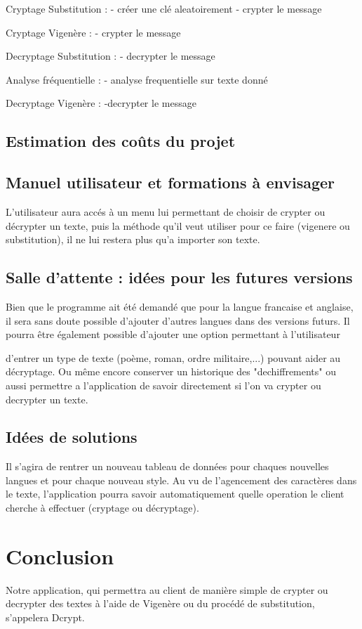 \documentclass[a4]{article}
\begin{document}
		Cryptage Substitution :
			- créer une clé aleatoirement
			- crypter le message
			
		Cryptage Vigenère :
			- crypter le message
			
		Decryptage Substitution :
			- decrypter le message
			
		Analyse fréquentielle :
			- analyse frequentielle sur texte donné
			
		Decryptage Vigenère :
			-decrypter le message
		
		\subsection{Estimation des coûts du projet}
		 
		\subsection{Manuel utilisateur et formations à envisager}
			L'utilisateur aura accés à un menu lui permettant de choisir de crypter ou décrypter un texte,
			puis la méthode qu'il veut utiliser pour ce faire (vigenere ou substitution), il ne lui restera 
			plus qu'a importer son texte.
		\subsection{Salle d’attente : idées pour les futures versions}
			Bien que le programme ait été demandé que pour la langue francaise et anglaise, 
			il sera sans doute possible d'ajouter d'autres langues dans des versions futurs. 
			Il pourra être également possible d'ajouter une option permettant à l'utilisateur

			d'entrer un type de texte (poème, roman, ordre militaire,...) pouvant aider au décryptage. Ou même encore conserver un historique des "dechiffrements" ou aussi permettre a l'application de savoir directement si l'on va crypter ou decrypter un texte.

		\subsection{Idées de solutions}
		 	Il s'agira de rentrer un nouveau tableau de données pour chaques nouvelles langues et pour chaque nouveau style.
			Au vu de l'agencement des caractères dans le texte, l'application pourra savoir automatiquement quelle operation le client cherche à effectuer (cryptage ou décryptage).
			
			\section{Conclusion}
			Notre application, qui permettra au client de manière simple de crypter ou decrypter des textes
			à l'aide de Vigenère ou du procédé de substitution, s'appelera Dcrypt. 
			
\end{document}
